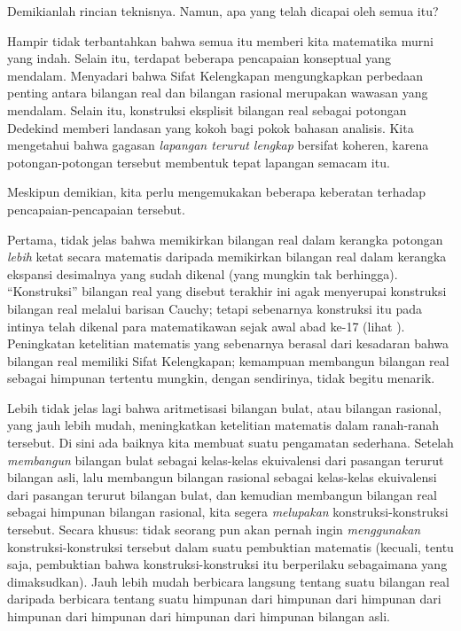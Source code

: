 \documentclass[../../../include/open-logic-section]{subfiles}
\begin{document}

Demikianlah rincian teknisnya. Namun, apa yang telah dicapai oleh semua itu?

Hampir tidak terbantahkan bahwa semua itu memberi kita matematika murni yang
{indah}. Selain itu, terdapat beberapa pencapaian konseptual yang
mendalam. Menyadari bahwa Sifat Kelengkapan mengungkapkan perbedaan penting
antara bilangan real dan bilangan rasional merupakan wawasan yang mendalam.
Selain itu, konstruksi eksplisit bilangan real sebagai potongan Dedekind
memberi landasan yang kokoh bagi pokok bahasan analisis. Kita mengetahui bahwa
gagasan \emph{lapangan terurut lengkap} bersifat koheren, karena
potongan-potongan tersebut membentuk tepat lapangan semacam itu.

Meskipun demikian, kita perlu mengemukakan beberapa keberatan terhadap
pencapaian-pencapaian tersebut.

Pertama, tidak jelas bahwa memikirkan bilangan real dalam kerangka potongan
\emph{lebih} ketat secara matematis daripada memikirkan bilangan real dalam kerangka ekspansi
desimalnya yang sudah dikenal (yang mungkin tak berhingga). ``Konstruksi''
bilangan real yang disebut terakhir ini agak menyerupai konstruksi bilangan
real melalui barisan Cauchy; tetapi sebenarnya konstruksi itu pada intinya
telah dikenal para matematikawan sejak awal abad ke-17 (lihat
). Peningkatan ketelitian matematis yang sebenarnya berasal dari
kesadaran bahwa bilangan real memiliki Sifat Kelengkapan; kemampuan membangun
bilangan real sebagai himpunan tertentu mungkin, dengan sendirinya, tidak
begitu menarik.

Lebih tidak jelas lagi bahwa aritmetisasi bilangan bulat, atau bilangan
rasional, yang jauh lebih mudah, meningkatkan ketelitian matematis dalam ranah-ranah
tersebut. Di sini ada baiknya kita membuat suatu pengamatan sederhana. Setelah
\emph{membangun} bilangan bulat sebagai kelas-kelas ekuivalensi dari pasangan
terurut bilangan asli, lalu membangun bilangan rasional sebagai kelas-kelas
ekuivalensi dari pasangan terurut bilangan bulat, dan kemudian membangun
bilangan real sebagai himpunan bilangan rasional, kita segera
\emph{melupakan} konstruksi-konstruksi tersebut. Secara khusus: tidak seorang
pun akan pernah ingin \emph{menggunakan} konstruksi-konstruksi tersebut dalam
suatu pembuktian matematis (kecuali, tentu saja, pembuktian bahwa
konstruksi-konstruksi itu berperilaku sebagaimana yang dimaksudkan). Jauh lebih
mudah berbicara langsung tentang suatu bilangan real daripada berbicara
tentang suatu himpunan dari himpunan dari himpunan dari himpunan dari himpunan
dari himpunan dari himpunan bilangan asli.
%
%
%
	
\end{document}
